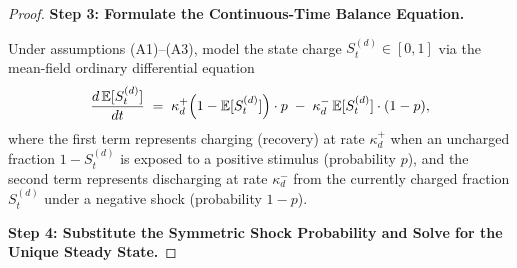 \documentclass[12pt,openany]{book}
\numberwithin{equation}{chapter}
\theoremstyle{plain}
\theoremstyle{definition}
\theoremstyle{remark}
\def\mathcal#1{#1}%
\begin{document}
\begin{proof}
\medskip
\noindent\textbf{Step 3: Formulate the Continuous-Time Balance
Equation.}

\noindent
Under assumptions (A1)--(A3), model the state charge
$\mathcal{S}_t^{(d)} \in [0,1]$ via the mean-field
ordinary differential equation
\begin{equation}
  \frac{d\,\mathbb{E}[\mathcal{S}_t^{(d)}]}{dt}
  \;=\;
  \kappa_d^{+}
  \Bigl(1 - \mathbb{E}[\mathcal{S}_t^{(d)}]\Bigr)
  \cdot p
  \;-\;
  \kappa_d^{-}
  \,\mathbb{E}[\mathcal{S}_t^{(d)}]
  \cdot (1 - p),
  \label{eq:ode-balance}
\end{equation}
where the first term represents charging (recovery) at rate
$\kappa_d^{+}$ when an uncharged fraction
$1 - \mathcal{S}_t^{(d)}$ is exposed to a positive stimulus
(probability $p$), and the second term represents discharging
at rate $\kappa_d^{-}$ from the currently charged fraction
$\mathcal{S}_t^{(d)}$ under a negative shock (probability
$1-p$).

\medskip
\noindent\textbf{Step 4: Substitute the Symmetric Shock
Probability and Solve for the Unique Steady State.}


\end{proof}
\end{document}
